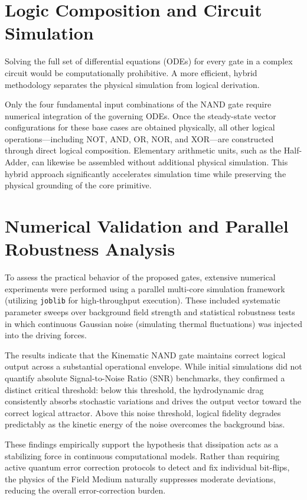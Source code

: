 \documentclass[12pt]{article}
\begin{document}
\section{Logic Composition and Circuit Simulation}
Solving the full set of differential equations (ODEs) for every gate in a complex circuit would be computationally prohibitive. A more efficient, hybrid methodology separates the physical simulation from logical derivation.

Only the four fundamental input combinations of the NAND gate require numerical integration of the governing ODEs. Once the steady-state vector configurations for these base cases are obtained physically, all other logical operations---including NOT, AND, OR, NOR, and XOR---are constructed through direct logical composition. Elementary arithmetic units, such as the Half-Adder, can likewise be assembled without additional physical simulation. This hybrid approach significantly accelerates simulation time while preserving the physical grounding of the core primitive.

\section{Numerical Validation and Parallel Robustness Analysis}
To assess the practical behavior of the proposed gates, extensive numerical experiments were performed using a parallel multi-core simulation framework (utilizing \texttt{joblib} for high-throughput execution). These included systematic parameter sweeps over background field strength and statistical robustness tests in which continuous Gaussian noise (simulating thermal fluctuations) was injected into the driving forces.

The results indicate that the Kinematic NAND gate maintains correct logical output across a substantial operational envelope. While initial simulations did not quantify absolute Signal-to-Noise Ratio (SNR) benchmarks, they confirmed a distinct critical threshold: below this threshold, the hydrodynamic drag consistently absorbs stochastic variations and drives the output vector toward the correct logical attractor. Above this noise threshold, logical fidelity degrades predictably as the kinetic energy of the noise overcomes the background bias.

These findings empirically support the hypothesis that dissipation acts as a stabilizing force in continuous computational models. Rather than requiring active quantum error correction protocols to detect and fix individual bit-flips, the physics of the Field Medium naturally suppresses moderate deviations, reducing the overall error-correction burden.
\end{document}
